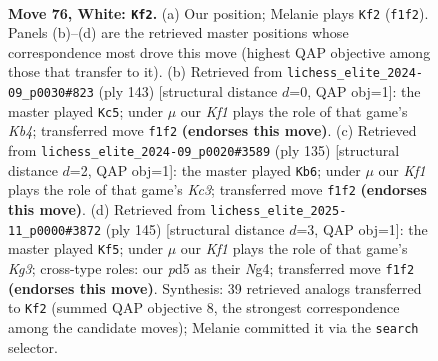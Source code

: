 \documentclass[11pt]{article}
\begin{document}
\clearpage

\begin{figure}[p]\centering
\begin{subfigure}{0.46\textwidth}\centering
\resizebox{\linewidth}{!}{%
\newchessgame
\chessboard[
  setfen={8/4k3/6r1/2pp4/p7/8/8/5K2 w - - 8 76},
  showmover=false,
  pgfstyle=straightmove, color=movearrow, markmove={f1-f2}
]}
\caption{}
\end{subfigure}\hfill
\begin{subfigure}{0.46\textwidth}\centering
\resizebox{\linewidth}{!}{%
\newchessgame
\chessboard[
  setfen={8/5P2/8/1k1P2P1/7R/3K4/8/8 b - - 0 72},
  showmover=false,
  pgfstyle=straightmove, color=movearrow, markmove={b5-c5}
]}
\caption{}
\end{subfigure}
\\[4pt]
\begin{subfigure}{0.46\textwidth}\centering
\resizebox{\linewidth}{!}{%
\newchessgame
\chessboard[
  setfen={4K3/8/2k5/R7/8/1P5P/8/8 b - - 0 68},
  showmover=false,
  pgfstyle=straightmove, color=movearrow, markmove={c6-b6}
]}
\caption{}
\end{subfigure}\hfill
\begin{subfigure}{0.46\textwidth}\centering
\resizebox{\linewidth}{!}{%
\newchessgame
\chessboard[
  setfen={8/R7/3K2k1/8/1P1P2n1/8/8/8 b - - 4 73},
  showmover=false,
  pgfstyle=straightmove, color=movearrow, markmove={g6-f5}
]}
\caption{}
\end{subfigure}
\caption{\textbf{Move 76, White: \texttt{Kf2}.} (a) Our position; Melanie plays \texttt{Kf2} (\texttt{f1f2}). Panels (b)--(d) are the retrieved master positions whose correspondence most drove this move (highest QAP objective among those that transfer to it). (b) Retrieved from \texttt{lichess\_elite\_2024-09\_p0030\#823} (ply 143) [structural distance $d$=0, QAP obj=1]: the master played \texttt{Kc5}; under $\mu$ our \emph{Kf1} plays the role of that game's \emph{Kb4}; transferred move \texttt{f1f2} \textbf{(endorses this move)}. (c) Retrieved from \texttt{lichess\_elite\_2024-09\_p0020\#3589} (ply 135) [structural distance $d$=2, QAP obj=1]: the master played \texttt{Kb6}; under $\mu$ our \emph{Kf1} plays the role of that game's \emph{Kc3}; transferred move \texttt{f1f2} \textbf{(endorses this move)}. (d) Retrieved from \texttt{lichess\_elite\_2025-11\_p0000\#3872} (ply 145) [structural distance $d$=3, QAP obj=1]: the master played \texttt{Kf5}; under $\mu$ our \emph{Kf1} plays the role of that game's \emph{Kg3}; cross-type roles: our \emph{p}d5 as their \emph{N}g4; transferred move \texttt{f1f2} \textbf{(endorses this move)}. Synthesis: 39 retrieved analogs transferred to \texttt{Kf2} (summed QAP objective 8, the strongest correspondence among the candidate moves); Melanie committed it via the \texttt{search} selector.}
\label{fig:thought-m150}
\end{figure}
\end{document}
